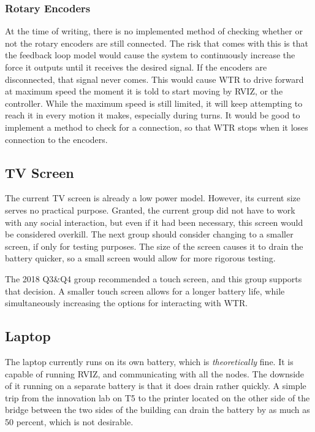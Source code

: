 \subsubsection{Rotary Encoders}
At the time of writing, there is no implemented method of checking whether or not the rotary encoders are still connected.
The risk that comes with this is that the feedback loop model would cause the system to continuously increase the force it outputs until it receives the desired signal.
If the encoders are disconnected, that signal never comes.
This would cause WTR to drive forward at maximum speed the moment it is told to start moving by RVIZ, or the controller.
While the maximum speed is still limited, it will keep attempting to reach it in every motion it makes, especially during turns.
It would be good to implement a method to check for a connection, so that WTR stops when it loses connection to the encoders.

\subsection{TV Screen}
The current TV screen is already a low power model.
However, its current size serves no practical purpose.
Granted, the current group did not have to work with any social interaction, but even if it had been necessary, this screen would be considered overkill.
The next group should consider changing to a smaller screen, if only for testing purposes.
The size of the screen causes it to drain the battery quicker, so a small screen would allow for more rigorous testing.

The 2018 Q3\&Q4 group recommended a touch screen, and this group supports that decision.
A smaller touch screen allows for a longer battery life, while simultaneously increasing the options for interacting with WTR.

\subsection{Laptop}
The laptop currently runs on its own battery, which is \textit{theoretically} fine.
It is capable of running RVIZ, and communicating with all the nodes.
The downside of it running on a separate battery is that it does drain rather quickly.
A simple trip from the innovation lab on T5 to the printer located on the other side of the bridge between the two sides of the building can drain the battery by as much as 50 percent, which is not desirable.



